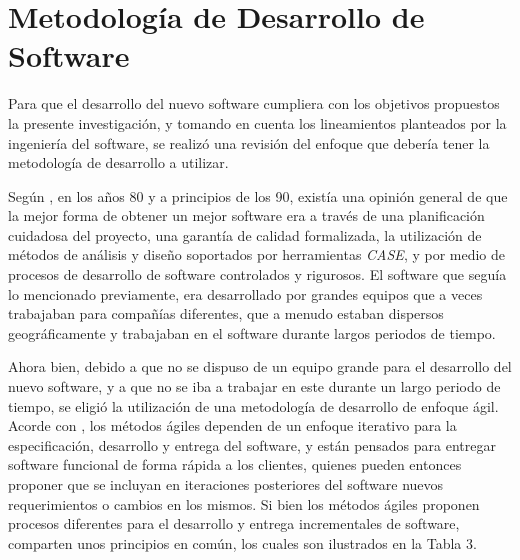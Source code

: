 	\section{Metodolog\'{i}a de Desarrollo de Software}
Para que el desarrollo del nuevo software cumpliera con los objetivos propuestos la presente investigaci\'{o}n, y tomando en cuenta los lineamientos planteados por la ingenier\'{i}a del software, se realiz\'{o} una revisi\'{o}n del enfoque que deber\'{i}a tener la metodolog\'{i}a de desarrollo a utilizar.

Seg\'{u}n \cite{Sommerville}, en los a\~{n}os 80 y a principios de los 90, exist\'{i}a una opini\'{o}n general de que la mejor forma de obtener un mejor software era a trav\'{e}s de una planificaci\'{o}n cuidadosa del proyecto, una garant\'{i}a de calidad formalizada, la utilizaci\'{o}n de m\'{e}todos de an\'{a}lisis y dise\~{n}o soportados por herramientas \textit{CASE}, y por medio de procesos de desarrollo de software controlados y rigurosos. El software que segu\'{i}a lo mencionado previamente, era desarrollado por grandes equipos que a veces trabajaban para compa\~{n}\'{i}as diferentes, que a menudo estaban dispersos geogr\'{a}ficamente y trabajaban en el software durante largos periodos de tiempo.

Ahora bien, debido a que no se dispuso de un equipo grande para el desarrollo del nuevo software, y a que no se iba a trabajar en este durante un largo periodo de tiempo, se eligi\'{o} la utilizaci\'{o}n de una metodolog\'{i}a de desarrollo de enfoque \'{a}gil. Acorde con \cite{Sommerville}, los m\'{e}todos \'{a}giles dependen de un enfoque iterativo para la especificaci\'{o}n, desarrollo y entrega del software, y est\'{a}n pensados para entregar software funcional de forma r\'{a}pida a los clientes, quienes pueden entonces proponer que se incluyan en iteraciones posteriores del software nuevos requerimientos o cambios en los mismos. Si bien los m\'{e}todos \'{a}giles proponen procesos diferentes para el desarrollo y entrega incrementales de software, comparten unos principios en com\'{u}n, los cuales son ilustrados en la Tabla 3.

